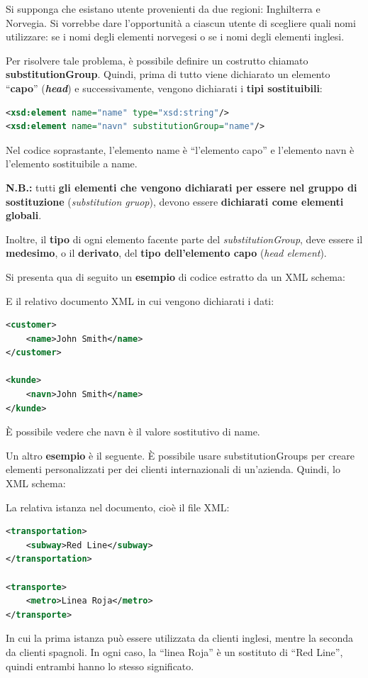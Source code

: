 \documentclass[a4paper]{article}
\newcommand{\dquotes}[1]{``#1''}
\begin{document}
	\noindent
	Si supponga che esistano utente provenienti da due regioni: Inghilterra e Norvegia. Si vorrebbe dare l'opportunità a ciascun utente di scegliere quali nomi utilizzare: se i nomi degli elementi norvegesi o se i nomi degli elementi inglesi.\newline
	
	\noindent
	Per risolvere tale problema, è possibile definire un costrutto chiamato \textcolor{Red3}{\textbf{\textsf{substitutionGroup}}}. Quindi, prima di tutto viene dichiarato un elemento \dquotes{\textbf{capo}} (\emph{\textbf{head}}) e successivamente, vengono dichiarati i \textbf{tipi sostituibili}:
	\begin{lstlisting}[language=XML]
<xsd:element name="name" type="xsd:string"/>
<xsd:element name="navn" substitutionGroup="name"/>\end{lstlisting}
	Nel codice soprastante, l'elemento \textsf{name} è \dquotes{l'elemento capo} e l'elemento \textsf{navn} è l'elemento sostituibile a \textsf{name}.\newline
	
	\noindent
	\textbf{N.B.:} tutti \textbf{gli elementi che vengono dichiarati per essere nel gruppo di sostituzione} (\emph{substitution gruop}), devono essere \textbf{dichiarati come elementi globali}.
	
	Inoltre, il \textbf{tipo} di ogni elemento facente parte del \emph{substitutionGroup}, deve essere il \textbf{medesimo}, o il \textbf{derivato}, del \textbf{tipo dell'elemento capo} (\emph{head element}).\newline
	
	\noindent
	Si presenta qua di seguito un \textcolor{Green4}{\textbf{esempio}} di codice estratto da un XML schema:
	
	E il relativo documento XML in cui vengono dichiarati i dati:
	\begin{lstlisting}[language=XML]
<customer>
	<name>John Smith</name>
</customer>

<kunde>
	<navn>John Smith</name>
</kunde>\end{lstlisting}
	È possibile vedere che \textsf{navn} è il valore sostitutivo di \textsf{name}.\newpage
	
	\noindent
	Un altro \textcolor{Green4}{\textbf{esempio}} è il seguente. È possibile usare \textsf{substitutionGroups} per creare elementi personalizzati per dei clienti internazionali di un'azienda. Quindi, lo XML schema:
	
	La relativa istanza nel documento, cioè il file XML:
	\begin{lstlisting}[language=XML]
<transportation>
	<subway>Red Line</subway>
</transportation>

<transporte>
	<metro>Linea Roja</metro>
</transporte>\end{lstlisting}
	In cui la prima istanza può essere utilizzata da clienti inglesi, mentre la seconda da clienti spagnoli. In ogni caso, la \dquotes{linea Roja} è un sostituto di \dquotes{Red Line}, quindi entrambi hanno lo stesso significato.\newpage
	
\end{document}
